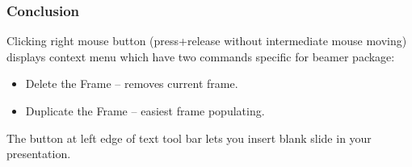 \documentclass{beamer}
\begin{document}
\begin{frame}
  \frametitle{Conclusion}

  Clicking right mouse button 
  (press+release without intermediate mouse moving) 
  displays context menu
  which have two commands specific for beamer package: 

  \begin{itemize}
  \item
     \alert{Delete the Frame} -- removes current frame.
  \item
     \alert{Duplicate the Frame} -- easiest frame populating.
  \end{itemize}

  The button 
  at left edge of text 
  tool bar lets you insert blank slide in your presentation.

\end{frame}
\end{document}

